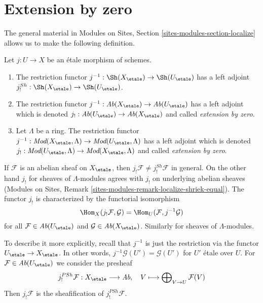 \section{Extension by zero}
\label{section-extension-by-zero}

\noindent
The general material in
Modules on Sites, Section \ref{sites-modules-section-localize}
allows us to make the following definition.

\begin{definition}
\label{definition-extension-zero}
Let $j : U \to X$ be an \'etale morphism of schemes.
\begin{enumerate}
\item The restriction functor
$j^{-1} : \Sh(X_\etale) \to \Sh(U_\etale)$
has a left adjoint
$j_!^{Sh} : \Sh(X_\etale) \to \Sh(U_\etale)$.
\item The restriction functor
$j^{-1} : \textit{Ab}(X_\etale) \to \textit{Ab}(U_\etale)$
has a left adjoint which is denoted
$j_! : \textit{Ab}(U_\etale) \to \textit{Ab}(X_\etale)$
and called {\it extension by zero}.
\item Let $\Lambda$ be a ring. The restriction functor
$j^{-1} : \textit{Mod}(X_\etale, \Lambda) \to
\textit{Mod}(U_\etale, \Lambda)$
has a left adjoint which is denoted
$j_! : \textit{Mod}(U_\etale, \Lambda) \to
\textit{Mod}(X_\etale, \Lambda)$
and called {\it extension by zero}.
\end{enumerate}
\end{definition}

\noindent
If $\mathcal{F}$ is an abelian sheaf on $X_\etale$, then
$j_!\mathcal{F} \not = j_!^{Sh}\mathcal{F}$ in general. On the other hand
$j_!$ for sheaves of $\Lambda$-modules agrees with $j_!$ on underlying
abelian sheaves
(Modules on Sites, Remark \ref{sites-modules-remark-localize-shriek-equal}).
The functor $j_!$ is characterized by the functorial isomorphism
$$
\Hom_X(j_!\mathcal{F}, \mathcal{G}) = \Hom_U(\mathcal{F}, j^{-1}\mathcal{G})
$$
for all $\mathcal{F} \in \textit{Ab}(U_\etale)$ and
$\mathcal{G} \in \textit{Ab}(X_\etale)$. Similarly for
sheaves of $\Lambda$-modules.

\medskip\noindent
To describe it more explicitly, recall that $j^{-1}$ is just the restriction
via the functor $U_\etale \to X_\etale$. In other words,
$j^{-1}\mathcal{G}(U') = \mathcal{G}(U')$ for $U'$ \'etale over $U$.
For $\mathcal{F} \in \textit{Ab}(U_\etale)$
we consider the presheaf
$$
j_!^{PSh}\mathcal{F} : X_\etale \longrightarrow \textit{Ab},
\quad
V \longmapsto \bigoplus\nolimits_{V \to U} \mathcal{F}(V)
$$
Then $j_!\mathcal{F}$ is the sheafification of $j_!^{PSh}\mathcal{F}$.

